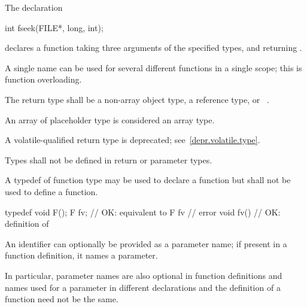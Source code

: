 \pnum
\begin{example}
The declaration
\begin{codeblock}
int fseek(FILE*, long, int);
\end{codeblock}
declares a function taking three arguments of the specified types,
and returning
.
\end{example}

\pnum
{}%
\begin{note}
A single name can be used for several different functions in a single scope;
this is function overloading.
\end{note}

\pnum
{}%
%
The return type shall be a non-array object type, a reference type, or \cv{}~.
\begin{note}
An array of placeholder type is considered an array type.
\end{note}

\pnum
A volatile-qualified return type is deprecated;
see~\ref{depr.volatile.type}.

\pnum
Types shall not be defined in return or parameter types.

\pnum
{}%
A typedef of function type may be used to declare a function but shall not be
used to define a function.
\begin{example}
\begin{codeblock}
typedef void F();
F  fv;              // OK: equivalent to 
F  fv { }           // error
void fv() { }       // OK: definition of 
\end{codeblock}
\end{example}

\pnum
An identifier can optionally be provided as a parameter name;
if present in a function definition, it names a parameter.
\begin{note}
In particular, parameter names are also optional in function definitions
and names used for a parameter in different declarations and the definition
of a function need not be the same.
\end{note}

